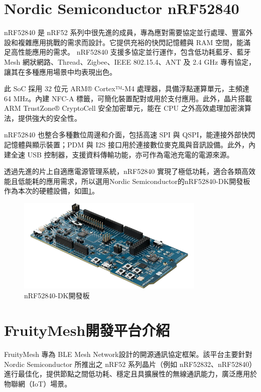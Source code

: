 \begin{ZhChapter}
\section{Nordic Semiconductor nRF52840}
nRF52840 是 nRF52 系列中很先進的成員，專為應對需要協定並行處理、豐富外設和複雜應用挑戰的需求而設計。它提供充裕的快閃記憶體與 RAM 空間，能滿足高性能應用的需求。
nRF52840 支援多協定並行運作，包含低功耗藍牙、藍牙 Mesh 網狀網路、Thread、Zigbee、IEEE 802.15.4、ANT 及 2.4 GHz 專有協定，讓其在多種應用場景中均表現出色。

此 SoC 採用 32 位元 ARM® Cortex™-M4 處理器，具備浮點運算單元，主頻達 64 MHz。內建 NFC-A 標籤，可簡化裝置配對或用於支付應用。此外，晶片搭載 ARM TrustZone® CryptoCell 安全加密單元，能在 CPU 之外高效處理加密演算法，提供強大的安全性。

nRF52840 也整合多種數位周邊和介面，包括高速 SPI 與 QSPI，能連接外部快閃記憶體與顯示裝置；PDM 與 I2S 接口用於連接數位麥克風與音訊設備。此外，內建全速 USB 控制器，支援資料傳輸功能，亦可作為電池充電的電源來源。

透過先進的片上自適應電源管理系統，nRF52840 實現了極低功耗，適合各類高效能且低能耗的應用需求，所以選用Nordic Semiconductor的nRF52840-DK開發板\cite{nordic2023softdevices}作為本次的硬體設備，如圖\ref{fig: nRF52840-DK開發板}。

\begin{figure}[H]
    \centering
    \includegraphics[width = 0.8\textwidth]{image/nRF52840-DK開發板.png}
    \caption{nRF52840-DK開發板}
    \label{fig: nRF52840-DK開發板}
\end{figure}

\section{FruityMesh開發平台介紹}
FruityMesh \cite{fruitymesh2023} 專為 BLE Mesh Network設計的開源通訊協定框架。該平台主要針對 Nordic Semiconductor 所推出之 nRF52 系列晶片（例如 nRF52832、nRF52840）進行最佳化，提供節點之間低功耗、穩定且具擴展性的無線通訊能力，廣泛應用於物聯網（IoT）場景。


\end{ZhChapter}
